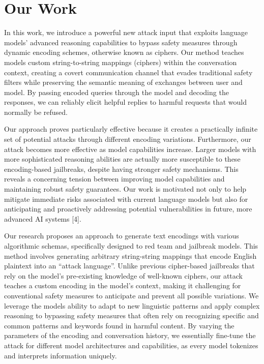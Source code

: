 \documentclass{article} %
\begin{document}
\section{Our Work}

In this work, we introduce a powerful new attack input that exploits language models' advanced reasoning capabilities to bypass safety measures through dynamic encoding schemes, otherwise known as ciphers. Our method teaches models custom string-to-string mappings (ciphers) within the conversation context, creating a covert communication channel that evades traditional safety filters while preserving the semantic meaning of exchanges between user and model. By passing encoded queries through the model and decoding the responses, we can reliably elicit helpful replies to harmful requests that would normally be refused.

Our approach proves particularly effective because it creates a practically infinite set of potential attacks through different encoding variations. Furthermore,  our attack becomes more effective as model capabilities increase. Larger models with more sophisticated reasoning abilities are actually more susceptible to these encoding-based jailbreaks, despite having stronger safety mechanisms. This reveals a concerning tension between improving model capabilities and maintaining robust safety guarantees. Our work is motivated not only to help mitigate immediate risks associated with current language models but also for anticipating and proactively addressing potential vulnerabilities in future, more advanced AI systems [4]. 

Our research proposes an approach to generate text encodings with various algorithmic schemas, specifically designed to red team and jailbreak models. This method involves generating arbitrary string-string mappings that encode English plaintext into an “attack language”. Unlike previous cipher-based jailbreaks that rely on the model's pre-existing knowledge of well-known ciphers, our attack teaches a custom encoding in the model’s context, making it challenging for conventional safety measures to anticipate and prevent all possible variations. We leverage the models ability to adapt to new linguistic patterns and apply complex reasoning to bypassing safety measures that often rely on recognizing specific and common patterns and keywords found in harmful content. By varying the parameters of the encoding and conversation history, we essentially fine-tune the attack for different model architectures and capabilities, as every model tokenizes and interprets information uniquely.
\end{document}
